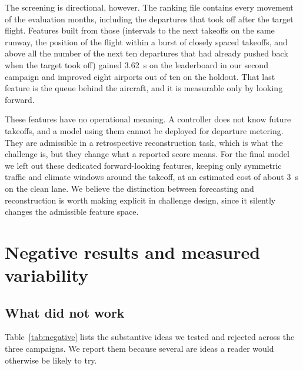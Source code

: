 \documentclass[11pt,a4paper]{article}
\begin{document}
The screening is directional, however. The ranking file contains every
movement of the evaluation months, including the departures that took off
after the target flight. Features built from those (intervals to the next
takeoffs on the same runway, the position of the flight within a burst of
closely spaced takeoffs, and above all the number of the next ten departures
that had already pushed back when the target took off) gained
\SI{3.62}{\second} on the leaderboard in our second campaign and improved
eight airports out of ten on the holdout. That last feature is the queue
behind the aircraft, and it is measurable only by looking forward.

These features have no operational meaning. A controller does not know future
takeoffs, and a model using them cannot be deployed for departure metering.
They are admissible in a retrospective reconstruction task, which is what the
challenge is, but they change what a reported score means. For the final
model we left out these dedicated forward-looking features, keeping only
symmetric traffic and climate windows around the takeoff, at an estimated cost
of about \SI{3}{\second} on the clean lane. We
believe the distinction between forecasting and reconstruction is worth making
explicit in challenge design, since it silently changes the admissible
feature space.

\section{Negative results and measured variability}
\label{sec:noise}

\subsection{What did not work}

Table~\ref{tab:negative} lists the substantive ideas we tested and rejected
across the three campaigns. We report them because several are ideas a reader
would otherwise be likely to try.
\end{document}
